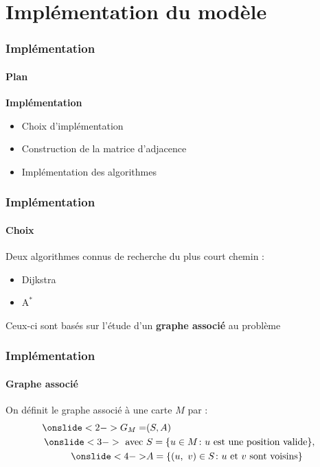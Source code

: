 \section{Implémentation du modèle}


\begin{frame}

    \frametitle{Implémentation}
    \framesubtitle{Plan}

    \textbf{Implémentation}

    \begin{itemize}
        \item <2-> Choix d'implémentation
        \item <3-> Construction de la matrice d'adjacence
        \item <4-> Implémentation des algorithmes
    \end{itemize}
\end{frame}


\begin{frame}
    \frametitle{Implémentation}
    \framesubtitle{Choix}
    Deux algorithmes connus de recherche du plus court chemin :
    \begin{itemize}
        \item <2-> Dijkstra
        \item <3-> $\text{A}^{*}$
    \end{itemize}

    \bigskip
    Ceux-ci sont basés sur l'étude d'un \textbf{graphe associé} au problème
\end{frame}


\begin{frame}
    \frametitle{Implémentation}
    \framesubtitle{Graphe associé}
    On définit le graphe associé à une carte $M$ par :
    \bigskip
    \begin{align*}
        \onslide<2-> G_M =& (S, A) \\
        \onslide<3-> \text{ avec } &S = \{u \in M \colon u \text{ est une position valide}\}, \\
        \onslide<4->  &A = \{(u,\ v)\in S \colon u \text{ et } v \text{ sont voisins}\}
    \end{align*}

\end{frame}


